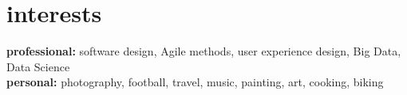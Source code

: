 \documentclass[]{friggeri-cv}
\begin{document}

\section{interests}

\textbf{\headingfont professional:} software design, Agile methods, user experience design, Big Data, Data Science \\ 
\textbf{\headingfont personal:} photography, football, travel, music, painting, art, cooking, biking



\end{document}
